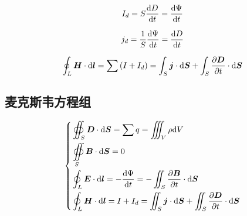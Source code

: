 \documentclass{article}
\begin{document}
\[I_d=S\frac{\mathrm d D}{\mathrm d t}=\frac{\mathrm d\Psi}{\mathrm d t}\]

\[j_d=\frac1S\frac{\mathrm d\Psi}{\mathrm d t}=\frac{\mathrm d D}{\mathrm d t}\]

\[\oint_L\boldsymbol{H}\cdot\mathrm d\boldsymbol{l}=\sum\left(I+I_d\right)=\int_S\boldsymbol{j}\cdot\mathrm d\boldsymbol{S}+\int_S\frac{\partial\boldsymbol{D}}{\partial t}\cdot\mathrm d\boldsymbol{S}\]

\subsection{麦克斯韦方程组}

\[\left\{\begin{aligned}
         & \oiint_S\boldsymbol{D}\cdot\mathrm d\boldsymbol{S}=\sum q=\iiint_V\rho\mathrm d V                                                           \\
         & \oiint\limits_S\boldsymbol{B}\cdot\mathrm d\boldsymbol{S}=0                                                                          \\
         & \oint_L\boldsymbol{E}\cdot\mathrm d\boldsymbol{l}=-\frac{\mathrm d\Psi}{\mathrm d t}=-\iint_S\frac{\partial\boldsymbol{B}}{\partial t}\cdot\mathrm d\boldsymbol{S}          \\
         & \oint_L\boldsymbol{H}\cdot\mathrm d\boldsymbol{l}=I+I_d=\iint_S\boldsymbol{j}\cdot\mathrm d\boldsymbol{S}+\iint_S\frac{\partial\boldsymbol{D}}{\partial t}\cdot\mathrm d\boldsymbol{S} \\
    \end{aligned}\right.\]
\end{document}
